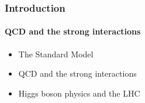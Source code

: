 \documentclass[aspectratio=43]{beamer}
\begin{document}
%
%

\begin{frame}


\end{frame}

\begin{frame}

	\frametitle{Introduction}
	\framesubtitle{QCD and the strong interactions}
	
	\begin{itemize}
		\item \footnotesize The Standard Model
		\item \footnotesize QCD and the strong interactions
		\item \footnotesize Higgs boson physics and the LHC
	\end{itemize}


\end{frame}
\end{document}
